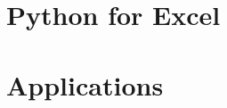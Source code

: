 \documentclass{book} %
\begin{document}
\chapter{Python for Excel}


\chapter{Applications}





\backmatter

\printbibliography
\end{document}
